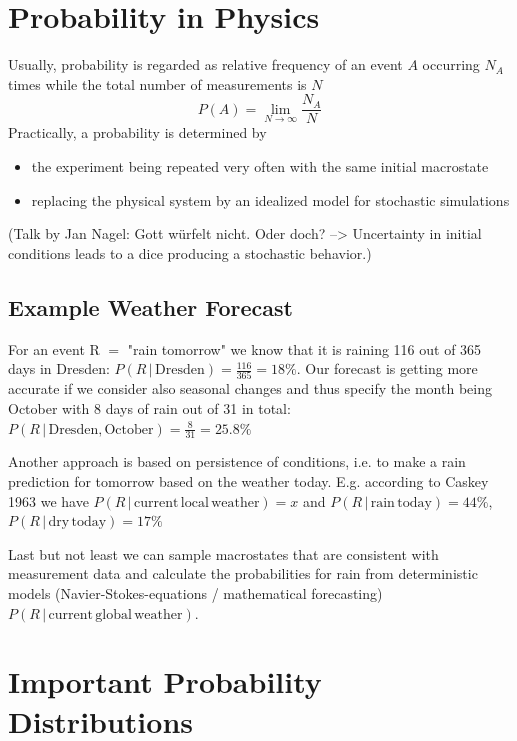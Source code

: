 \documentclass{notebook}
\begin{document}
\section{Probability in Physics}

Usually, probability is regarded as relative frequency of an event $A$ occurring $N_A$ times while the total number of measurements is $N$
%
\begin{equation}
P(A) = \lim_{N \to \infty}{\frac{N_A}{N}}
\end{equation}
%
Practically, a probability is determined by
%
\begin{itemize}
	\item{the experiment being repeated very often with the same initial macrostate}
	\item{replacing the physical system by an idealized model for stochastic simulations}
\end{itemize}
%
(Talk by Jan Nagel: Gott würfelt nicht. Oder doch? --> Uncertainty in initial conditions leads to a dice producing a stochastic behavior.)

\subsection*{Example Weather Forecast}

For an event R $=$ "rain tomorrow" we know that it is raining 116 out of 365 days in Dresden: $P(R \, | \, \mathrm{Dresden}) = \frac{116}{365} = 18 \%$. Our forecast is getting more accurate if we consider also seasonal changes and thus specify the month being October with 8 days of rain out of 31 in total: $P(R \, | \, \mathrm{Dresden, October}) = \frac{8}{31} = 25.8 \%$

Another approach is based on persistence of conditions, i.e. to make a rain prediction for tomorrow based on the weather today. E.g. according to Caskey 1963 we have $P(R \, | \, \mathrm{current \, local \, weather}) = x$ and $P(R \, | \, \mathrm{rain \, today}) = 44 \%$, $P(R \, | \, \mathrm{dry \, today}) = 17 \%$

Last but not least we can sample macrostates that are consistent with measurement data and calculate the probabilities for rain from deterministic models (Navier-Stokes-equations / mathematical forecasting) $P(R \, | \, \mathrm{current \, global \, weather})$.

\section{Important Probability Distributions}
\end{document}
